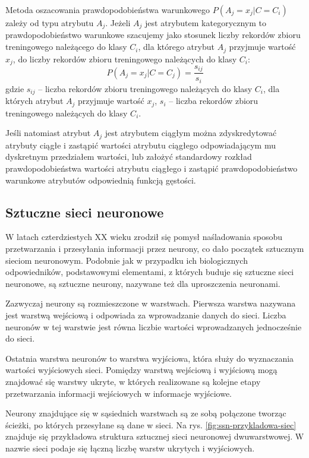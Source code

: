 Metoda oszacowania prawdopodobieństwa warunkowego $P(A_j = x_j | C = C_i)$ zależy od typu atrybutu $A_j$. Jeżeli $A_j$ jest atrybutem kategorycznym to prawdopodobieństwo warunkowe szacujemy jako stosunek liczby rekordów zbioru treningowego należącego do klasy $C_i$, dla którego atrybut $A_j$ przyjmuje wartość $x_j$, do liczby rekordów zbioru treningowego należących do klasy $C_i$:
\begin{equation} 
\label{bayes_PAC} 
P(A_j = x_j | C = C_j) = \frac{s_{ij}}{s_i}
\end{equation} gdzie $s_{ij}$ -- liczba rekordów zbioru treningowego należących do klasy $C_i$, dla których atrybut $A_j$ przyjmuje wartość $x_j$, $s_i$ -- liczba rekordów zbioru treningowego należących do klasy $C_i$.

Jeśli natomiast atrybut $A_j$ jest atrybutem ciągłym można zdyskredytować atrybuty ciągłe i zastąpić wartości atrybutu ciągłego odpowiadającym mu dyskretnym przedziałem wartości, lub założyć standardowy rozkład prawdopodobieństwa wartości atrybutu ciągłego i zastąpić prawdopodobieństwo warunkowe atrybutów odpowiednią funkcją gęstości.

\subsection{Sztuczne sieci neuronowe}
W latach czterdziestych XX wieku zrodził się pomysł naśladowania sposobu przetwarzania i przesyłania informacji przez neurony, co dało początek sztucznym sieciom neuronowym. Podobnie jak w przypadku ich biologicznych odpowiedników, podstawowymi elementami, z których buduje się sztuczne sieci neuronowe, są sztuczne neurony, nazywane też dla uproszczenia neuronami.

Zazwyczaj neurony są rozmieszczone w warstwach. Pierwsza warstwa nazywana jest warstwą wejściową i odpowiada za wprowadzanie danych do sieci. Liczba neuronów w tej warstwie jest równa liczbie wartości wprowadzanych jednocześnie do sieci.

Ostatnia warstwa neuronów to warstwa wyjściowa, która służy do wyznaczania wartości wyjściowych sieci. Pomiędzy warstwą wejściową i wyjściową mogą znajdować się warstwy ukryte, w których realizowane są kolejne etapy przetwarzania informacji wejściowych w informacje wyjściowe.

Neurony znajdujące się w sąsiednich warstwach są ze sobą połączone tworząc ścieżki, po których przesyłane są dane w sieci. Na rys. \ref{fig:ssn-przykladowa-siec} znajduje się przykładowa struktura sztucznej sieci neuronowej dwuwarstwowej. W nazwie sieci podaje się łączną liczbę warstw ukrytych i wyjściowych. 


